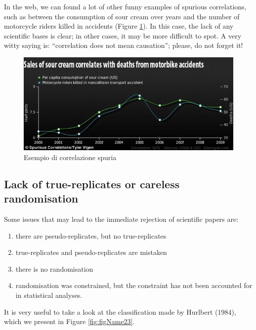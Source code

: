\documentclass[a4paper,12pt,oneside]{book}
\providecommand{\tightlist}{%
  \setlength{\itemsep}{0pt}\setlength{\parskip}{0pt}}
\begin{document}
In the web, we can found a lot of other funny examples of spurious correlations, such as between the consumption of sour cream over years and the number of motorcycle riders killed in accidents (Figure \ref{fig:figName22}). In this case, the lack of any scientific bases is clear; in other cases, it may be more difficult to spot. A very witty saying is: ``correlation does not mean causation''; please, do not forget it!

\begin{figure}

{\centering \includegraphics[width=0.9\linewidth]{_images/PannaAcida} 

}

\caption{Esempio di correlazione spuria}\label{fig:figName22}
\end{figure}

\hypertarget{lack-of-true-replicates-or-careless-randomisation}{%
\subsection{Lack of true-replicates or careless randomisation}\label{lack-of-true-replicates-or-careless-randomisation}}

Some issues that may lead to the immediate rejection of scientific papers are:

\begin{enumerate}
\def\labelenumi{\arabic{enumi}.}
\tightlist
\item
  there are pseudo-replicates, but no true-replicates
\item
  true-replicates and pseudo-replicates are mistaken
\item
  there is no randomisation
\item
  randomisation was constrained, but the constraint has not been accounted for in statistical analyses.
\end{enumerate}

It is very useful to take a look at the classification made by Hurlbert (1984), which we present in Figure \ref{fig:figName23}.
\end{document}
